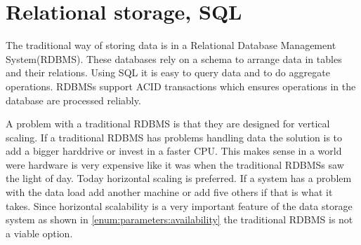 \section{Relational storage, SQL}
\label{sec:sql}
The traditional way of storing data is in a Relational Database Management System(RDBMS).
These databases rely on a schema to arrange data in tables and their relations.
Using SQL it is easy to query data and to do aggregate operations.
RDBMSs support ACID transactions which ensures operations in the database are processed reliably.


A problem with a traditional RDBMS is that they are designed for vertical scaling\cite{Atzeni:TheRelationalModelIsDead}. If a traditional RDBMS has problems handling data the solution is to add a bigger harddrive or invest in a faster CPU. This makes sense in a world were hardware is very expensive like it was when the traditional RDBMSs saw the light of day\cite{Stonebraker:TheEndOfAnArchitecturalEra}. Today horizontal scaling is preferred. If a system has a problem with the data load add another machine or add five others if that is what it takes. Since horizontal scalability is a very important feature of the data storage system as shown in \cref{enum:parameters:availability} the traditional RDBMS is not a viable option.

